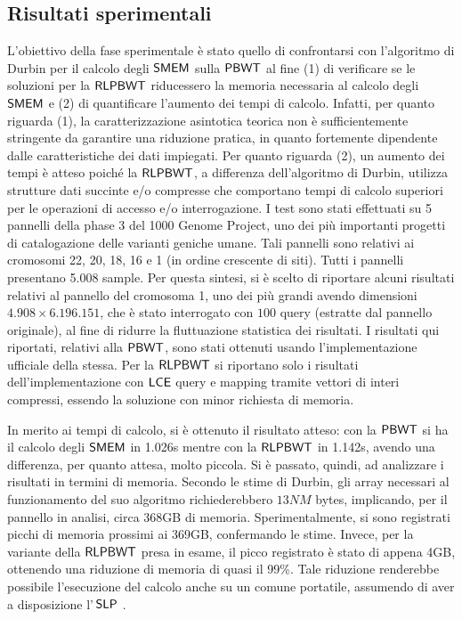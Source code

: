 \documentclass[a4paper,11pt, oneside,italian]{article}
\def\SLP{\mbox{\rm {\sf SLP}}}
\def\LCE{\mbox{\rm {\sf LCE}}}
\def\PBWT{\mbox{\rm {\sf PBWT}}}
\def\RLPBWT{\mbox{\rm {\sf RLPBWT}}}
\def\SMEM{\mbox{\rm {\sf SMEM}}}
\def\LCE{\mbox{\rm {\sf LCE}}}
\begin{document}
\subsection*{Risultati sperimentali}
L'obiettivo della fase sperimentale è stato quello di confrontarsi con
l'algoritmo di Durbin per il calcolo degli $\SMEM$ sulla $\PBWT$ al fine 
(1) di verificare se le soluzioni per la $\RLPBWT$ riducessero la memoria
necessaria al calcolo degli 
$\SMEM$ e (2) di quantificare l'aumento dei tempi di calcolo.
Infatti, per quanto riguarda (1), la caratterizzazione asintotica teorica non è
sufficientemente stringente da garantire una riduzione pratica, in quanto
fortemente dipendente dalle caratteristiche dei dati impiegati.
Per quanto riguarda (2), un aumento dei tempi è atteso poiché la $\RLPBWT$,
a differenza dell'algoritmo di Durbin, utilizza strutture dati succinte e/o
compresse che comportano tempi di calcolo superiori per le operazioni di accesso
e/o interrogazione. 
I test sono stati effettuati su 5 pannelli della phase 3 del 1000 Genome
Project, uno dei più importanti progetti di catalogazione delle varianti
geniche 
umane. Tali pannelli sono relativi ai cromosomi 22, 20, 18, 16 e 1
(in ordine crescente di siti). Tutti i pannelli presentano 5.008 sample.
Per questa sintesi, si è scelto di riportare alcuni risultati relativi al
pannello del cromosoma 1, uno dei più grandi avendo dimensioni $4.908 \times
6.196.151$, che è stato 
interrogato con $100$ query (estratte dal pannello originale), al 
fine di ridurre la fluttuazione statistica dei risultati.
I risultati qui riportati, relativi alla $\PBWT$, sono stati ottenuti usando
l'implementazione ufficiale della stessa. Per la $\RLPBWT$ si riportano solo i
risultati dell'implementazione con $\LCE$ query e mapping tramite vettori di
interi compressi, essendo la soluzione con minor richiesta di memoria. 

In merito ai tempi di calcolo, si è ottenuto il risultato atteso: con
la $\PBWT$ si ha il calcolo degli $\SMEM$ in 1.026s
mentre con la $\RLPBWT$ in 1.142s, avendo una differenza, per quanto attesa,
molto piccola.
Si è passato, quindi, ad analizzare i risultati in termini di memoria. Secondo
le stime di Durbin, gli array necessari al funzionamento del suo algoritmo
richiederebbero $13NM$ bytes, implicando, per il pannello in analisi, circa
368GB di memoria. 
Sperimentalmente, si sono registrati
picchi di memoria prossimi ai 369GB, confermando le stime. Invece,
per la variante della $\RLPBWT$ presa in esame, il picco
registrato è stato di appena 4GB, 
ottenendo una riduzione di memoria di quasi il 99\%. Tale riduzione renderebbe
possibile l'esecuzione del calcolo anche su un comune portatile, assumendo di
aver a disposizione l'$\,\SLP$ . 
\end{document}
